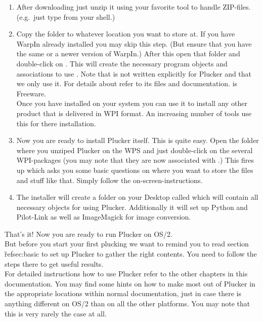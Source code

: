\begin{enumerate}
  \item After downloading  just unzip it
  using your favorite tool to handle ZIP-files. (e.g.\ just type
   from your shell.)

  \item Copy the  folder to whatever location you want to
  store  at. If you have WarpIn already installed you
  may skip this step. (But ensure that you have the same or a newer
  version of WarpIn.) After this open that folder and double-click on
  . This will create the necessary program
  objects and associations to use . Note that
   is not written explicitly for Plucker and that we only
  use it. For details about  refer to its 
  files and documentation.   is Freeware.\\

\note Once you have installed  on your system you can use
it to install any other product that is delivered in WPI format. An
increasing number of tools use this for there installation. 

  \item Now you are ready to install Plucker itself. This is quite
  easy. Open the folder where you unziped Plucker on the WPS and just
  double-click on the several WPI-packages (you may note that they are
  now associated with .) This fires up 
  which asks you some basic questions on where you want to store the
  files and stuff like that. Simply follow the on-screen-instructions.

  \item The installer will create a folder on your Desktop called
   which will contain all necessary objects for
  using Plucker. Additionally it will set up Python and Pilot-Link as
  well as ImageMagick for image conversion.
\end{enumerate}

That's it! Now you are ready to run Plucker on OS/2. \\

But before you start your first plucking we want to remind you to
read section \~ref{sec:basic} to set up Plucker to gather the right
contents.  You need to follow the steps there to get useful
results.\\

For detailed instructions how to use Plucker refer to the other
chapters in this documentation. You may find some hints on how to make
most out of Plucker in the appropriate locations within normal
documentation, just in case there is anything different on OS/2 than
on all the other platforms. You may note that this is very rarely the
case at all.\\


